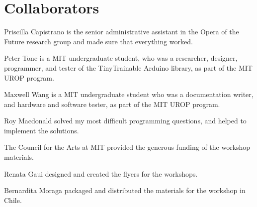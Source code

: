 \section{Collaborators}

Priscilla Capistrano is the senior administrative assistant in the Opera of the Future research group and made sure that everything worked.

Peter Tone is a MIT undergraduate student, who was a researcher, designer, programmer, and tester of the TinyTrainable Arduino library, as part of the MIT UROP program.

Maxwell Wang is a MIT undergraduate student who was a documentation writer, and hardware and software tester, as part of the MIT UROP program.

Roy Macdonald solved my most difficult programming questions, and helped to implement the solutions.

The Council for the Arts at MIT provided the generous funding of the workshop materials.

Renata Gaui designed and created the flyers for the workshops.

Bernardita Moraga packaged and distributed the materials for the workshop in Chile.

\newpage
